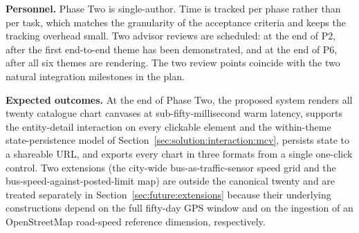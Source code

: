 \noindent\textbf{Personnel.} Phase Two is single-author. Time is tracked per
phase rather than per task, which matches the granularity of the acceptance
criteria and keeps the tracking overhead small. Two advisor reviews are
scheduled: at the end of P2, after the first end-to-end theme has been
demonstrated, and at the end of P6, after all six themes are rendering.
The two review points coincide with the two natural integration milestones
in the plan.

\noindent\textbf{Expected outcomes.} At the end of Phase Two, the proposed
system renders all twenty catalogue chart canvases at sub-fifty-millisecond
warm latency, supports the entity-detail interaction on every clickable
element and the within-theme state-persistence model of
Section~\ref{sec:solution:interaction:mcv}, persists state to a shareable
URL, and exports every chart in three formats from a single one-click
control. Two extensions (the city-wide bus-as-traffic-sensor speed grid and
the bus-speed-against-posted-limit map) are outside the canonical twenty
and are treated separately in Section~\ref{sec:future:extensions} because
their underlying constructions depend on the full fifty-day GPS window and
on the ingestion of an OpenStreetMap road-speed reference dimension,
respectively.
